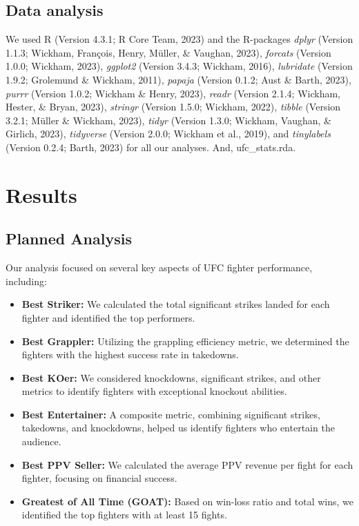 \documentclass[
  man,floatsintext]{apa6}
\begin{document}
\hypertarget{data-analysis}{%
\subsection{Data analysis}\label{data-analysis}}

We used R (Version 4.3.1; R Core Team, 2023) and the R-packages \emph{dplyr} (Version 1.1.3; Wickham, François, Henry, Müller, \& Vaughan, 2023), \emph{forcats} (Version 1.0.0; Wickham, 2023), \emph{ggplot2} (Version 3.4.3; Wickham, 2016), \emph{lubridate} (Version 1.9.2; Grolemund \& Wickham, 2011), \emph{papaja} (Version 0.1.2; Aust \& Barth, 2023), \emph{purrr} (Version 1.0.2; Wickham \& Henry, 2023), \emph{readr} (Version 2.1.4; Wickham, Hester, \& Bryan, 2023), \emph{stringr} (Version 1.5.0; Wickham, 2022), \emph{tibble} (Version 3.2.1; Müller \& Wickham, 2023), \emph{tidyr} (Version 1.3.0; Wickham, Vaughan, \& Girlich, 2023), \emph{tidyverse} (Version 2.0.0; Wickham et al., 2019), and \emph{tinylabels} (Version 0.2.4; Barth, 2023) for all our analyses. And, ufc\_stats.rda.

\hypertarget{results}{%
\section{Results}\label{results}}

\hypertarget{planned-analysis}{%
\subsection{Planned Analysis}\label{planned-analysis}}

Our analysis focused on several key aspects of UFC fighter performance, including:

\begin{itemize}
\item
  \textbf{Best Striker:} We calculated the total significant strikes landed for each fighter and identified the top performers.
\item
  \textbf{Best Grappler:} Utilizing the grappling efficiency metric, we determined the fighters with the highest success rate in takedowns.
\item
  \textbf{Best KOer:} We considered knockdowns, significant strikes, and other metrics to identify fighters with exceptional knockout abilities.
\item
  \textbf{Best Entertainer:} A composite metric, combining significant strikes, takedowns, and knockdowns, helped us identify fighters who entertain the audience.
\item
  \textbf{Best PPV Seller:} We calculated the average PPV revenue per fight for each fighter, focusing on financial success.
\item
  \textbf{Greatest of All Time (GOAT):} Based on win-loss ratio and total wins, we identified the top fighters with at least 15 fights.
\end{itemize}
\end{document}
